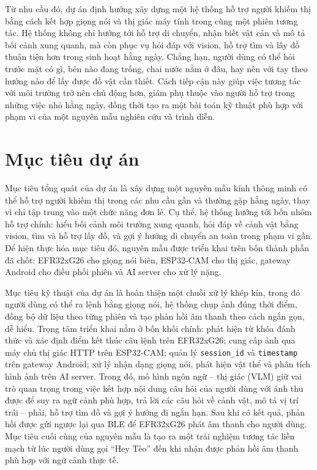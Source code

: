 \documentclass[11pt,a4paper]{article}
\begin{document}
Từ nhu cầu đó, dự án định hướng xây dựng một hệ thống hỗ trợ người khiếm thị bằng cách kết hợp giọng nói và thị giác máy tính trong cùng một phiên tương tác. Hệ thống không chỉ hướng tới hỗ trợ di chuyển, nhận biết vật cản và mô tả bối cảnh xung quanh, mà còn phục vụ hỏi đáp với vision, hỗ trợ tìm và lấy đồ thuận tiện hơn trong sinh hoạt hằng ngày. Chẳng hạn, người dùng có thể hỏi trước mặt có gì, bên nào đang trống, chai nước nằm ở đâu, hay nên với tay theo hướng nào để lấy được đồ vật cần thiết. Cách tiếp cận này giúp việc tương tác với môi trường trở nên chủ động hơn, giảm phụ thuộc vào người hỗ trợ trong những việc nhỏ hằng ngày, đồng thời tạo ra một bài toán kỹ thuật phù hợp với phạm vi của một nguyên mẫu nghiên cứu và trình diễn.

\section{Mục tiêu dự án}
Mục tiêu tổng quát của dự án là xây dựng một nguyên mẫu kính thông minh có thể hỗ trợ người khiếm thị trong các nhu cầu gần và thường gặp hằng ngày, thay vì chỉ tập trung vào một chức năng đơn lẻ. Cụ thể, hệ thống hướng tới bốn nhóm hỗ trợ chính: hiểu bối cảnh môi trường xung quanh, hỏi đáp về cảnh vật bằng vision, tìm và hỗ trợ lấy đồ, và gợi ý hướng di chuyển an toàn trong phạm vi gần. Để hiện thực hóa mục tiêu đó, nguyên mẫu được triển khai trên bốn thành phần đã chốt: EFR32xG26 cho giọng nói biên, ESP32-CAM cho thị giác, gateway Android cho điều phối phiên và AI server cho xử lý nặng.

Mục tiêu kỹ thuật của dự án là hoàn thiện một chuỗi xử lý khép kín, trong đó người dùng có thể ra lệnh bằng giọng nói, hệ thống chụp ảnh đúng thời điểm, đồng bộ dữ liệu theo từng phiên và tạo phản hồi âm thanh theo cách ngắn gọn, dễ hiểu. Trọng tâm triển khai nằm ở bốn khối chính: phát hiện từ khóa đánh thức và xác định điểm kết thúc câu lệnh trên EFR32xG26; cung cấp ảnh qua máy chủ thị giác HTTP trên ESP32-CAM; quản lý \texttt{session\_id} và \texttt{timestamp} trên gateway Android; xử lý nhận dạng giọng nói, phát hiện vật thể và phân tích hình ảnh trên AI server. Trong đó, mô hình ngôn ngữ -- thị giác (VLM) giữ vai trò quan trọng trong việc kết hợp nội dung câu hỏi của người dùng với ảnh thu được để suy ra ngữ cảnh phù hợp, trả lời các câu hỏi về cảnh vật, mô tả vị trí trái -- phải, hỗ trợ tìm đồ và gợi ý hướng đi ngắn hạn. Sau khi có kết quả, phản hồi được gửi ngược lại qua BLE để EFR32xG26 phát âm thanh cho người dùng. Mục tiêu cuối cùng của nguyên mẫu là tạo ra một trải nghiệm tương tác liền mạch từ lúc người dùng gọi ``Hey Tèo'' đến khi nhận được phản hồi âm thanh phù hợp với ngữ cảnh thực tế.
\end{document}
